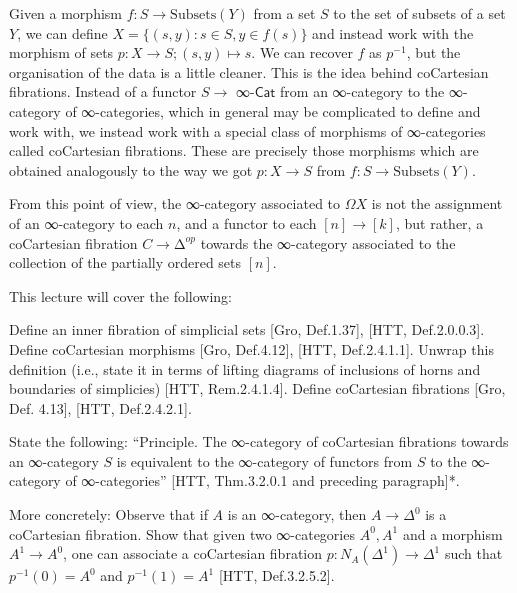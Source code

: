 \documentclass[a4paper]{amsart}
\numberwithin{figure}{section}
\theoremstyle{theorem}
\theoremstyle{definition}
\begin{document}
Given a morphism $f: S \to \mathrm{Subsets}(Y)$ from a set $S$ to the set of subsets of a set $Y$, we can define $X = \{(s, y) : s \in S, y \in f(s)\}$ and instead work with the morphism of sets $p: X \to S; (s, y) \mapsto s$. We can recover $f$ as $p^{-1}$, but the organisation of the data is a little cleaner. This is the idea behind coCartesian fibrations. Instead of a functor $S \to $ ∞-$\mathsf{Cat}$ from an ∞-category to the ∞-category of ∞-categories, which in general may be complicated to define and work with, we instead work with a special class of morphisms of ∞-categories called coCartesian fibrations. These are precisely those morphisms which are obtained analogously to the way we got $p: X → S$ from $f: S → \mathrm{Subsets}(Y)$.

From this point of view, the ∞-category associated to $\Omega X$ is not the assignment of an ∞-category to each $n$, and a functor to each $[n] → [k]$, but rather, a coCartesian fibration $C → ∆^{op}$ towards the ∞-category associated to the collection of the partially ordered sets $[n]$.



This lecture will cover the following:

Define an inner fibration of simplicial sets [Gro, Def.1.37], [HTT, Def.2.0.0.3]. %
Define coCartesian morphisms [Gro, Def.4.12], [HTT, Def.2.4.1.1]. %
Unwrap this definition (i.e., state it in terms of lifting diagrams of inclusions of horns and boundaries of simplicies) [HTT, Rem.2.4.1.4]. %
Define coCartesian fibrations [Gro, Def. 4.13], [HTT, Def.2.4.2.1]. %

State the following: ``Principle. The ∞-category of coCartesian fibrations towards an ∞-category $S$ is equivalent to the ∞-category of functors from $S$ to the ∞-category of ∞-categories'' [HTT, Thm.3.2.0.1 and preceding paragraph]*. %

More concretely: %
Observe that if $A$ is an ∞-category, then $A {\to} \Delta^0$ is a coCartesian fibration. %
Show that given two ∞-categories $A^{0}, A^{1}$ and a morphism $A^{1} \to A^{0}$, one can associate a coCartesian fibration $p: N_A(\Delta^1) \to \Delta^1$ such that $p^{-1}(0) = A^0$ and $p^{-1}(1) = A^1$ [HTT, Def.3.2.5.2]. %
\end{document}
